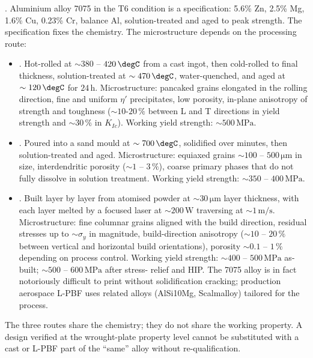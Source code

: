. Aluminium alloy 7075 in the
T6 condition is a specification: 5.6\% Zn, 2.5\% Mg, 1.6\% Cu, 0.23\%
Cr, balance Al, solution-treated and aged to peak strength. The
specification fixes the chemistry. The microstructure depends on the
processing route:

\begin{itemize}[leftmargin=*]
\item {}. Hot-rolled at $\sim 380$ -- $420\,
  \degC$ from a cast ingot, then cold-rolled to final thickness,
  solution-treated at $\sim 470\,\degC$, water-quenched, and aged at
  $\sim 120\,\degC$ for $24\,\text{h}$. Microstructure: pancaked
  grains elongated in the rolling direction, fine and uniform
  $\eta'$ precipitates, low porosity, in-plane anisotropy of strength
  and toughness ($\sim 10$-$20\,\%$ between L and T directions in
  yield strength and $\sim 30\,\%$ in $K_{Ic}$). Working yield
  strength: $\sim 500\,\text{MPa}$.
\item {}. Poured into a sand mould at $\sim
  700\,\degC$, solidified over minutes, then solution-treated and
  aged. Microstructure: equiaxed grains $\sim 100$ -- $500\,\si{\micro\meter}$
  in size, interdendritic porosity ($\sim 1$ -- $3\,\%$), coarse
  primary phases that do not fully dissolve in solution treatment.
  Working yield strength: $\sim 350$ -- $400\,\text{MPa}$.
\item {}. Built layer by
  layer from atomised powder at $\sim 30\,\si{\micro\meter}$ layer
  thickness, with each layer melted by a focused laser at $\sim 200\,
  \text{W}$ traversing at $\sim 1\,\text{m}/\text{s}$. Microstructure:
  fine columnar grains aligned with the build direction, residual
  stresses up to $\sim \sigma_y$ in magnitude, build-direction
  anisotropy ($\sim 10$ -- $20\,\%$ between vertical and horizontal
  build orientations), porosity $\sim 0.1$ -- $1\,\%$ depending on
  process control. Working yield strength: $\sim 400$ -- $500\,
  \text{MPa}$ as-built; $\sim 500$ -- $600\,\text{MPa}$ after stress-
  relief and HIP. The 7075 alloy is in fact notoriously difficult to
  print without solidification cracking; production aerospace L-PBF
  uses related alloys (AlSi10Mg, Scalmalloy) tailored for the process.
\end{itemize}

The three routes share the chemistry; they do not share the working
property. A design verified at the wrought-plate property level cannot
be substituted with a cast or L-PBF part of the ``same'' alloy
without re-qualification.

